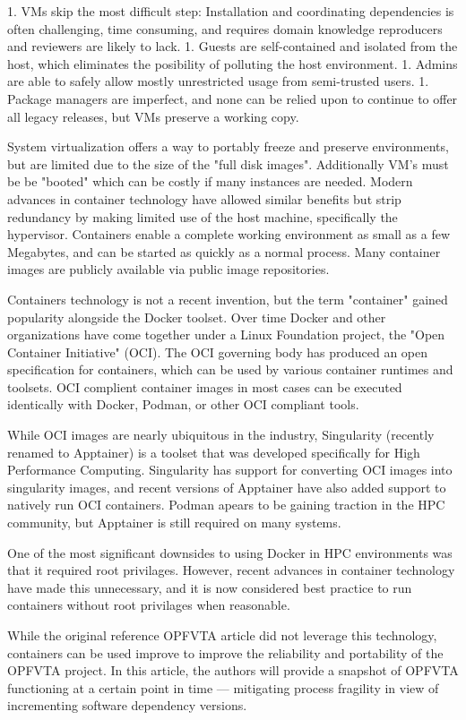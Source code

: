 1. VMs skip the most difficult step: Installation and coordinating dependencies is often challenging, time consuming, and requires domain knowledge reproducers and reviewers are likely to lack.
1. Guests are self-contained and isolated from the host, which eliminates the posibility of polluting the host environment.
1. Admins are able to safely allow mostly unrestricted usage from semi-trusted users.
1. Package managers are imperfect, and none can be relied upon to continue to offer all legacy releases, but VMs preserve a working copy.

System virtualization offers a way to portably freeze and preserve environments, but are limited due to the size of the "full disk images".
Additionally VM's must be be "booted" which can be costly if many instances are needed.
Modern advances in container technology have allowed similar benefits but strip redundancy by making limited use of the host machine, specifically the hypervisor.
Containers enable a complete working environment as small as a few Megabytes, and can be started as quickly as a normal process.
Many container images are publicly available via public image repositories.

Containers technology is not a recent invention, but the term "container" gained popularity alongside the Docker toolset.
Over time Docker and other organizations have come together under a Linux Foundation project, the "Open Container Initiative" (OCI).
The OCI governing body has produced an open specification for containers, which can be used by various container runtimes and toolsets.
OCI complient container images in most cases can be executed identically with Docker, Podman, or other OCI compliant tools.

While OCI images are nearly ubiquitous in the industry, Singularity (recently renamed to Apptainer) is a toolset that was developed specifically for High Performance Computing.
Singularity has support for converting OCI images into singularity images, and recent versions of Apptainer have also added support to natively run OCI containers.
Podman apears to be gaining traction in the HPC community, but Apptainer is still required on many systems.

One of the most significant downsides to using Docker in HPC environments was that it required root privilages.
However, recent advances in container technology have made this unnecessary, and it is now considered best practice to run containers without root privilages when reasonable.

While the original reference OPFVTA article did not leverage this technology, containers can be used improve to improve the reliability and portability of the OPFVTA project.
In this article, the authors will provide a snapshot of OPFVTA functioning at a certain point in time — mitigating process fragility in view of incrementing software dependency versions.

